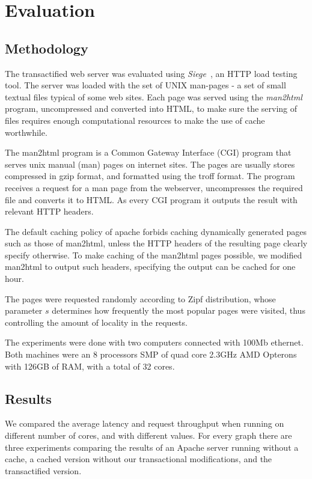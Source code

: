 \documentclass[preprint,natbib,11pt]{sigplanconf}
\begin{document}
\section{Evaluation}\label{sec:evaluation}
\subsection{Methodology} 
The transactified web server was evaluated using \emph{Siege}~\cite{siege}, an
HTTP load testing tool. The server was loaded with the set of UNIX man-pages - a
set of small textual files typical of some web sites. Each page was served using
the \emph{man2html}~\cite{man2html} program, uncompressed and converted into
HTML, to make sure the serving of files requires enough computational resources
to make the use of cache worthwhile.

The man2html program is a Common Gateway Interface (CGI) program that serves
unix manual (man) pages on internet sites. The pages are usually stores
compressed in gzip format, and formatted using the troff format. The program
receives a request for a man page from the webserver, uncompresses the required
file and converts it to HTML. As every CGI program it outputs the result with
relevant HTTP headers.

The default caching policy of apache forbids caching dynamically generated pages
such as those of man2html, unless the HTTP headers of the resulting page clearly
specify otherwise. To make caching of the man2html pages possible, we modified
man2html to output such headers, specifying the output can be cached for one
hour.

The pages were requested randomly according to Zipf distribution, whose
parameter $s$ determines how frequently the most popular pages were visited,
thus controlling the amount of locality in the requests.

The experiments were done with two computers connected with 100Mb ethernet.
Both machines were an 8 processors SMP of quad core 2.3GHz AMD Opterons 
with 126GB of RAM, with a total of 32 cores. 

\subsection{Results} 
We compared the average latency and request throughput when running on different
number of cores, and with different  values. For every graph there are three
experiments comparing the results of an Apache server running without a cache, a
cached version without our transactional modifications, and the transactified
version. 
\end{document}
